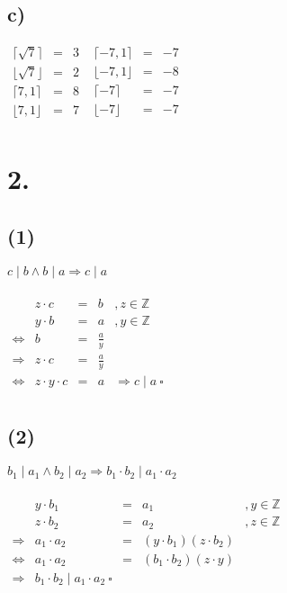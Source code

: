 \documentclass[a4paper]{scrartcl}
\newcommand{\qed}{\ \square}
\begin{document}
	\subsection{c)}		
	    \(
		\begin{array}{rcl}
			\lceil\sqrt{7}\rceil &=& 3 \\
			\lfloor\sqrt{7}\rfloor &=& 2 \\
			\lceil 7,1 \rceil &=& 8 \\
			\lfloor 7,1\rfloor &=& 7\\
		\end{array}
		\)
		\quad\quad
	    \(
		\begin{array}{rcl}
			\lceil -7,1 \rceil &=& -7 \\
			\lfloor -7,1\rfloor &=& -8 \\
			\lceil -7\rceil &=& -7 \\
			\lfloor -7\rfloor &=& -7\\
		\end{array}
		\)		

\section{2.}
	\subsection{(1)}
		\(c\mid b\land b\mid a \Rightarrow c\mid a\) \\ \\
		\(
		\begin{array}{rrcll}
			&z\cdot c&=&b &,z\in\mathbb{Z} \\
			&y\cdot b&=&a &,y\in\mathbb{Z} \\
			\Leftrightarrow &b&=&\frac{a}{y} \\
			\Rightarrow & z\cdot c &=&\frac{a}{y} \\
			\Leftrightarrow & z\cdot y\cdot c &=& a &\Rightarrow c\mid a\qed\\
		\end{array}
		\)

	\subsection{(2)}
		\(b_1\mid a_1\land b_2\mid a_2\Rightarrow b_1\cdot b_2\mid a_1 \cdot a_2\) \\ \\
		\(
		\begin{array}{rrcll}
			&y\cdot b_1 &=& a_1&,y\in\mathbb{Z}\\
			&z\cdot b_2 &=& a_2&,z\in\mathbb{Z}\\
			\Rightarrow &a_1\cdot a_2 &=&(y\cdot b_1)(z\cdot b_2)\\
			\Leftrightarrow &a_1\cdot a_2 &=&(b_1\cdot b_2) (z\cdot y) \\
			\Rightarrow &b_1\cdot b_2 \mid a_1\cdot a_2 \qed 
		\end{array}
		\)
		
\end{document}
